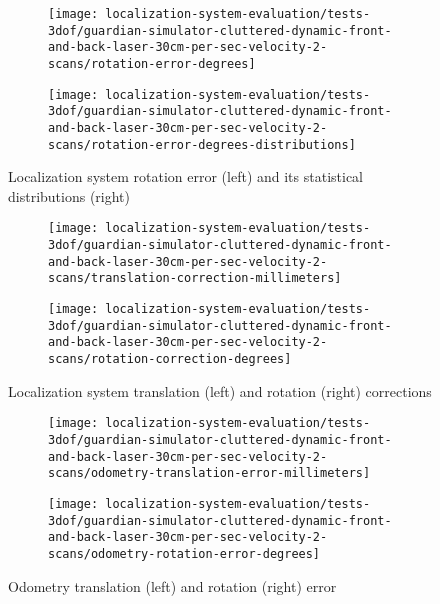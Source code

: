 \begin{figure}[H]
	\centering
	\begin{subfigure}[h]{0.47\textwidth}
		\centering
		\texttt{[image: localization-system-evaluation/tests-3dof/guardian-simulator-cluttered-dynamic-front-and-back-laser-30cm-per-sec-velocity-2-scans/rotation-error-degrees]}
	\end{subfigure}
	\begin{subfigure}[h]{0.47\textwidth}
		\centering
		\texttt{[image: localization-system-evaluation/tests-3dof/guardian-simulator-cluttered-dynamic-front-and-back-laser-30cm-per-sec-velocity-2-scans/rotation-error-degrees-distributions]}
	\end{subfigure}
	\caption{Localization system rotation error (left) and its statistical distributions (right)}
	\label{fig:localization-system-evaluation_guardian-simulator-cluttered-dynamic-front-and-back-laser-30cm-per-sec-velocity-2-scans_rotation-errors}
\end{figure}

\begin{figure}[ht]
	\centering
	\begin{subfigure}[h]{0.47\textwidth}
		\centering
		\texttt{[image: localization-system-evaluation/tests-3dof/guardian-simulator-cluttered-dynamic-front-and-back-laser-30cm-per-sec-velocity-2-scans/translation-correction-millimeters]}
	\end{subfigure}
	\begin{subfigure}[h]{0.47\textwidth}
		\centering
		\texttt{[image: localization-system-evaluation/tests-3dof/guardian-simulator-cluttered-dynamic-front-and-back-laser-30cm-per-sec-velocity-2-scans/rotation-correction-degrees]}
	\end{subfigure}
	\caption{Localization system translation (left) and rotation (right) corrections}
	\label{fig:localization-system-evaluation_guardian-simulator-cluttered-dynamic-front-and-back-laser-30cm-per-sec-velocity-2-scans_translation-rotation-corrections}
\end{figure}

\begin{figure}[ht]
	\centering
	\begin{subfigure}[h]{0.47\textwidth}
		\centering
		\texttt{[image: localization-system-evaluation/tests-3dof/guardian-simulator-cluttered-dynamic-front-and-back-laser-30cm-per-sec-velocity-2-scans/odometry-translation-error-millimeters]}
	\end{subfigure}
	\begin{subfigure}[h]{0.47\textwidth}
		\centering
		\texttt{[image: localization-system-evaluation/tests-3dof/guardian-simulator-cluttered-dynamic-front-and-back-laser-30cm-per-sec-velocity-2-scans/odometry-rotation-error-degrees]}
	\end{subfigure}
	\caption{Odometry translation (left) and rotation (right) error}
	\label{fig:localization-system-evaluation_guardian-simulator-cluttered-dynamic-front-and-back-laser-30cm-per-sec-velocity-2-scans_odometry-translation-rotation-errors}
\end{figure}

